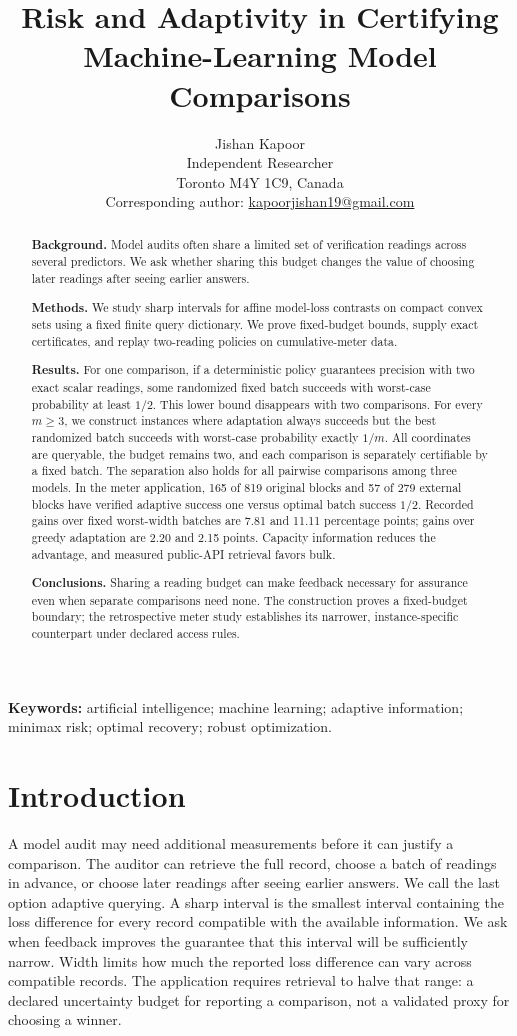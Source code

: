 \documentclass[12pt]{article}
\title{Risk and Adaptivity in Certifying Machine-Learning Model Comparisons}
\author{Jishan Kapoor\\Independent Researcher\\Toronto M4Y 1C9, Canada\\
Corresponding author: \href{mailto:kapoorjishan19@gmail.com}{kapoorjishan19@gmail.com}}
\date{}
\begin{document}
\maketitle
\begin{abstract}
\textbf{Background.} Model audits often share a limited set of verification
readings across several predictors. We ask whether sharing this budget
changes the value of choosing later readings after seeing earlier answers.

\textbf{Methods.} We study sharp intervals for affine model-loss contrasts
on compact convex sets using a fixed finite query dictionary. We prove fixed-budget bounds, supply exact
certificates, and replay two-reading policies on cumulative-meter data.

\textbf{Results.} For one comparison, if a deterministic policy guarantees
precision with two exact scalar readings, some randomized fixed batch succeeds with
worst-case probability at least $1/2$. This lower bound disappears with two
comparisons. For every $m\geq3$, we construct instances where adaptation
always succeeds but the best randomized batch succeeds with worst-case
probability exactly $1/m$. All coordinates are queryable, the budget remains
two, and each comparison is separately certifiable by a fixed batch.
The separation also holds for all pairwise comparisons among three models.
In the meter application, 165 of 819 original blocks and 57 of 279 external
blocks have verified adaptive success one versus optimal batch success $1/2$.
Recorded gains over fixed worst-width batches are 7.81 and 11.11 percentage
points; gains over greedy adaptation are 2.20 and 2.15 points.
Capacity information reduces the advantage, and measured public-API retrieval
favors bulk.

\textbf{Conclusions.} Sharing a reading budget can make feedback necessary
for assurance even when separate comparisons need none. The construction
proves a fixed-budget boundary; the retrospective meter study establishes
its narrower, instance-specific counterpart under declared access rules.
\end{abstract}
\noindent\textbf{Keywords:} artificial intelligence; machine learning;
adaptive information; minimax risk; optimal recovery; robust optimization.

\section{Introduction}
A model audit may need additional measurements before it can justify a
comparison. The auditor can retrieve the full record, choose a batch of
readings in advance, or choose later readings after seeing earlier answers.
We call the last option adaptive querying. A sharp interval is the smallest
interval containing the loss difference for every record compatible with
the available information. We ask when feedback improves the
guarantee that this interval will be sufficiently narrow. Width limits how
much the reported loss difference can vary across compatible records.
The application requires retrieval to halve that range: a declared uncertainty
budget for reporting a comparison, not a validated proxy for choosing a winner.
\end{document}
